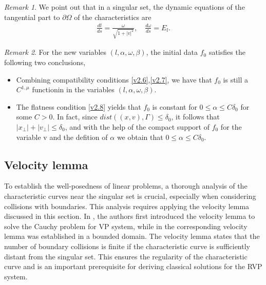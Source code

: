 \documentclass[11pt,reqno]{amsart}%
\theoremstyle{definition}
\theoremstyle{remark}
\newtheorem{Remark}{Remark}[section]
\begin{document}
\begin{Remark}
We point out that in a singular set,
the dynamic equations of the tangential part to $\partial\Omega$ of the characteristics are
\begin{align}
\frac{d l}{d s}=\frac{\omega}{\sqrt{1+|v|^{2}}},\quad \frac{d \omega}{d s}=E_{l}.\nonumber
\end{align}
\end{Remark}

\begin{Remark} For  the new variables $(l, \alpha, \omega, \beta)$, the initial data $f_{0}$ satisfies the following two conclusions,
\begin{itemize}
  \item [(1)]
   Combining compatibility conditions \eqref{v2.6},\eqref{v2.7}, we have that 
 $f_{0}$ is still a $C^{1,\mu}$ functionin in the variables $(l, \alpha, \omega, \beta)$.
  \item [(2)] The flatness condition \eqref{v2.8} yields that $f_{0}$ is constant for $0\leq\alpha\leq C\delta_{0}$ for some $C > 0 $.
%
  In fact, since $ dist((x,v), \Gamma)\leq \delta_{0}$, it follows that $|x_{\bot}|+|v_{\bot}|\leq \delta_{0}$, and with the help of the compact support of $f_{0}$  for the variable v and the defition of $\alpha$ we obtain that $0\leq\alpha\leq C\delta_{0}$.
\end{itemize}
\end{Remark}

\subsection{Velocity lemma}

To establish the well-posedness of linear problems, a thorough analysis of the characteristic curves near the singular set is crucial, especially when considering collisions with boundaries. This analysis requires applying the velocity lemma discussed in this section. %
In \cite{LP}, the authors first introduced the velocity lemma to solve the Cauchy problem for VP system, while in \cite{HV}  the corresponding velocity lemma was established in a bounded domain.
 The velocity lemma states that the number of boundary collisions is finite if the characteristic curve is sufficiently distant from the singular set. This ensures the regularity of the characteristic curve and is an important prerequisite for deriving classical solutions for the RVP system.
\end{document}
